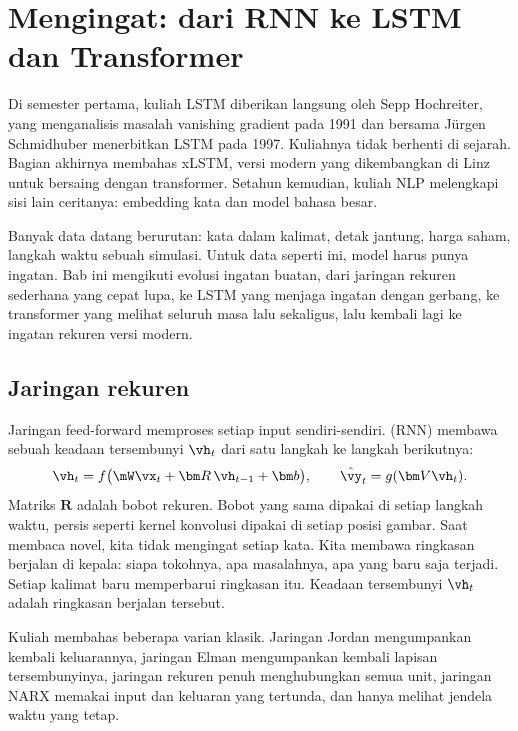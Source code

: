 \chapter{Mengingat: dari RNN ke LSTM dan Transformer}
\label{ch:lstm}

Di semester pertama, kuliah LSTM diberikan langsung oleh Sepp Hochreiter, yang menganalisis
masalah vanishing gradient pada 1991 dan bersama Jürgen Schmidhuber menerbitkan LSTM pada 1997.
Kuliahnya tidak berhenti di sejarah. Bagian akhirnya membahas xLSTM, versi modern yang
dikembangkan di Linz untuk bersaing dengan transformer. Setahun kemudian, kuliah NLP melengkapi
sisi lain ceritanya: embedding kata dan model bahasa besar.

Banyak data datang berurutan: kata dalam kalimat, detak jantung, harga saham, langkah waktu
sebuah simulasi. Untuk data seperti ini, model harus punya ingatan. Bab ini mengikuti evolusi
ingatan buatan, dari jaringan rekuren sederhana yang cepat lupa, ke LSTM yang menjaga ingatan
dengan gerbang, ke transformer yang melihat seluruh masa lalu sekaligus, lalu kembali lagi ke
ingatan rekuren versi modern.

\section{Jaringan rekuren}

Jaringan feed-forward memproses setiap input sendiri-sendiri. 
(RNN) membawa sebuah keadaan tersembunyi $\vh_t$ dari satu langkah ke langkah berikutnya:
\begin{equation}
\vh_t=f\big(\mW\vx_t+\bm R\,\vh_{t-1}+\bm b\big),\qquad \hat{\vy}_t=g(\bm V\vh_t).
\end{equation}
Matriks $\bm R$ adalah bobot rekuren. Bobot yang sama dipakai di setiap langkah waktu, persis
seperti kernel konvolusi dipakai di setiap posisi gambar. Saat membaca novel, kita tidak
mengingat setiap kata. Kita membawa ringkasan berjalan di kepala: siapa tokohnya, apa masalahnya,
apa yang baru saja terjadi. Setiap kalimat baru memperbarui ringkasan itu. Keadaan tersembunyi
$\vh_t$ adalah ringkasan berjalan tersebut.

Kuliah membahas beberapa varian klasik. Jaringan Jordan mengumpankan kembali keluarannya,
jaringan Elman mengumpankan kembali lapisan tersembunyinya, jaringan rekuren penuh menghubungkan
semua unit, jaringan NARX memakai input dan keluaran yang tertunda, dan  hanya melihat jendela waktu yang tetap.

